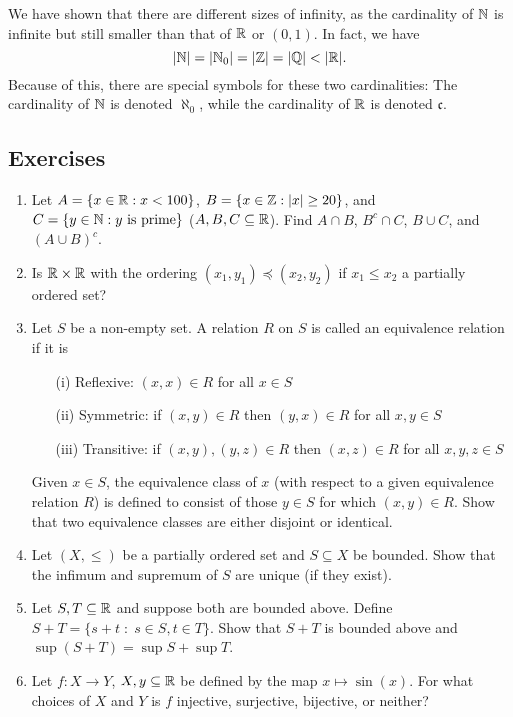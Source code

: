 \documentclass{article}
\begin{document}
We have shown that there are different sizes of infinity, as the cardinality of ${\mathbb{N}}$ is infinite but still smaller than that of ${\mathbb{R}}$ or $(0,1)$. In fact, we have
$$ |{\mathbb{N}}| = |{\mathbb{N}}_0| = |{\mathbb{Z}}| = |{\mathbb{Q}}| < | {\mathbb{R}}|.$$
Because of this, there are special symbols for these two cardinalities: The cardinality of ${\mathbb{N}}$ is denoted $\aleph_0$, while the cardinality of ${\mathbb{R}}$ is denoted $\mathfrak{c}$. 

\subsection{Exercises}
\label{subsec:ex_set_theory}
\begin{enumerate}
	\item Let $A = \{x\in {\mathbb{R}} : x <100\}$, $B = \{x\in {\mathbb{Z}} : |x| \geq 20\}$, and $C = \{y \in {\mathbb{N}} : y \text{ is prime}\}$ ($A,B,C \subseteq {\mathbb{R}}$). Find $A \cap B$, $B^c \cap C$, $B \cup C$, and $(A \cup B )^c$.
    \item Is ${\mathbb{R}} \times {\mathbb{R}}$ with the ordering $(x_1,y_1) \preceq (x_2,y_2)$ if $x_1 \leq x_2$ a partially ordered set? 
     \item \cite[Exercise 1.3.1]{tastetopology} Let $S$ be a non-empty set. A relation $R$ on $S$ is called an equivalence relation if it is
    \begin{enumerate}
        \item[(i)] Reflexive: $(x,x) \in R$ for all $x \in S$
        \item[(ii)] Symmetric: if $(x,y) \in R$  then $(y,x) \in R$ for all $x,y \in S$
        \item[(iii)] Transitive: if $(x,y), (y,z) \in R$ then $(x,z) \in R$ for all $x,y,z \in S$
    \end{enumerate}
Given $x \in S$, the equivalence class of $x$ (with respect to a given equivalence relation $R$) is defined to consist of those $y \in S$ for which $(x,y) \in R$. Show that two equivalence classes are either disjoint or identical.
    \item Let $(X, \leq)$ be a partially ordered set and $S\subseteq X$ be bounded. Show that the infimum and supremum of $S$ are unique (if they exist).
    \item Let $S,T \subseteq {\mathbb{R}}$ and suppose both are bounded above. Define $S+T = \{s + t \; \colon \; s\in S,t\in T\}$. Show that $S+T$ is bounded above and $\sup(S+T) = \sup S + \sup T$. 
    \item Let $f: X \to Y$, $X, y \subseteq {\mathbb{R}}$ be defined by the map $x \mapsto \sin(x)$. For what choices of $X$ and $Y$ is $f$ injective, surjective, bijective, or neither?

\end{enumerate}
\end{document}
